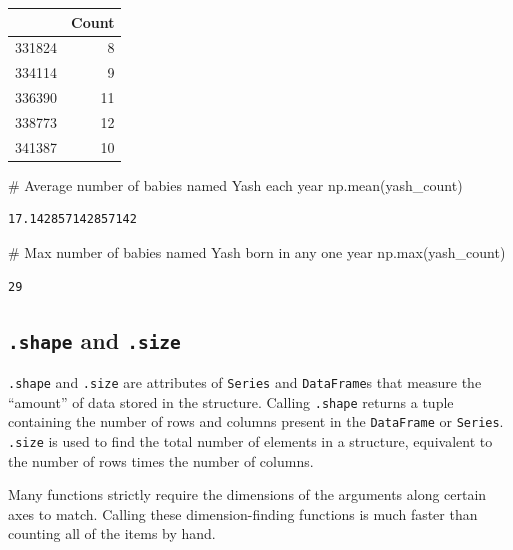 \documentclass[
  letterpaper,
  DIV=11,
  numbers=noendperiod]{scrreprt}
\newenvironment{Shaded}{\begin{snugshade}}{\end{snugshade}}
\newcommand{\BuiltInTok}[1]{\textcolor[rgb]{0.00,0.23,0.31}{#1}}
\newcommand{\CommentTok}[1]{\textcolor[rgb]{0.37,0.37,0.37}{#1}}
\newcommand{\NormalTok}[1]{\textcolor[rgb]{0.00,0.23,0.31}{#1}}
\begin{document}
\begin{tabular}{lr}
\toprule
{} &  Count \\
\midrule
331824 &      8 \\
334114 &      9 \\
336390 &     11 \\
338773 &     12 \\
341387 &     10 \\
\bottomrule
\end{tabular}

\begin{Shaded}
\begin{Highlighting}[]
\CommentTok{\# Average number of babies named Yash each year}
\NormalTok{np.mean(yash\_count)}
\end{Highlighting}
\end{Shaded}

\begin{verbatim}
17.142857142857142
\end{verbatim}

\begin{Shaded}
\begin{Highlighting}[]
\CommentTok{\# Max number of babies named Yash born in any one year}
\NormalTok{np.}\BuiltInTok{max}\NormalTok{(yash\_count)}
\end{Highlighting}
\end{Shaded}

\begin{verbatim}
29
\end{verbatim}

\hypertarget{shape-and-.size}{%
\subsection{\texorpdfstring{\texttt{.shape} and
\texttt{.size}}{.shape and .size}}\label{shape-and-.size}}

\texttt{.shape} and \texttt{.size} are attributes of \texttt{Series} and
\texttt{DataFrame}s that measure the ``amount'' of data stored in the
structure. Calling \texttt{.shape} returns a tuple containing the number
of rows and columns present in the \texttt{DataFrame} or
\texttt{Series}. \texttt{.size} is used to find the total number of
elements in a structure, equivalent to the number of rows times the
number of columns.

Many functions strictly require the dimensions of the arguments along
certain axes to match. Calling these dimension-finding functions is much
faster than counting all of the items by hand.
\end{document}
